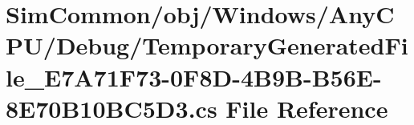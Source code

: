 \hypertarget{_sim_common_2obj_2_windows_2_any_c_p_u_2_debug_2_temporary_generated_file___e7_a71_f73-0_f8_d-4_a6c2ec773d44c40f74742f617307a523}{}\section{Sim\+Common/obj/\+Windows/\+Any\+C\+P\+U/\+Debug/\+Temporary\+Generated\+File\+\_\+\+E7\+A71\+F73-\/0\+F8\+D-\/4\+B9\+B-\/\+B56\+E-\/8\+E70\+B10\+B\+C5\+D3.cs File Reference}
\label{_sim_common_2obj_2_windows_2_any_c_p_u_2_debug_2_temporary_generated_file___e7_a71_f73-0_f8_d-4_a6c2ec773d44c40f74742f617307a523}
